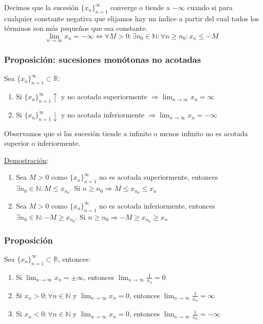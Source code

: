 \documentclass[10pt,a4paper,openright]{book}
\begin{document}
Decimos que la sucesión $\{x_n\}_{n=1}^\infty$ converge o tiende a $-\infty$ cuando si para cualquier constante negativa que elijamos hay un índice a partir del cual todos los términos son más pequeños que esa constante.
$$\lim_{n\rightarrow \infty} x_n=-\infty \Leftrightarrow \forall M>0: \exists n_0\in \mathbb N: \forall n \geq n_0: x_n\leq -M$$

\subsubsection*{Proposición: sucesiones monótonas no acotadas}
Sea $\{x_n\}_{n=1}^\infty\subset \mathbb R$:
\begin{enumerate}
\item Si $\{x_n\}_{n=1}^\infty \uparrow$ y no acotada superiormente $\Rightarrow \lim_{n\rightarrow \infty} x_n=\infty$

\item Si $\{x_n\}_{n=1}^\infty \downarrow$ y no acotada inferiormente $\Rightarrow \lim_{n\rightarrow \infty} x_n=-\infty$
\end{enumerate}

Observamos que si las sucesión tiende a infinito o menos infinito no es acotada superior o inferiormente.\par

\underline{Demostración}:\par

\begin{enumerate}
\item Sea $M>0$ como $\{x_n\}_{n=1}^\infty $ no es acotada superiormente, entonces $\exists n_0\in \mathbb N: M\leq x_{n_0}$. Si $n\geq n_0\Rightarrow M\leq x_{n_0}\leq x_n$

\item Sea $M>0$ como $\{x_n\}_{n=1}^\infty $ no es acotada inferiormente, entonces $\exists n_0\in \mathbb N: -M\geq x_{n_0}$. Si $n\geq n_0\Rightarrow -M\geq x_{n_0}\geq x_n$
\end{enumerate}

\subsubsection*{Proposición}
Sea $\{x_n\}_{n=1}^\infty \subset \mathbb R$, entonces:
\begin{enumerate}
\item Si $\lim_{n\rightarrow \infty} x_n=\pm \infty$, entonces $\lim_{n\rightarrow \infty} \frac{1}{x_n}=0$

\item Si $x_n>0: \forall n\in \mathbb N$ y $\lim_{n\rightarrow \infty} x_n=0$, entonces $\lim_{n\rightarrow \infty} \frac{1}{x_n}=\infty$

\item Si $x_n<0: \forall n\in \mathbb N$ y $\lim_{n\rightarrow \infty}x_n=0$, entonces $\lim_{n\rightarrow \infty} \frac{1}{x_n}=-\infty$
\end{enumerate}
\end{document}
